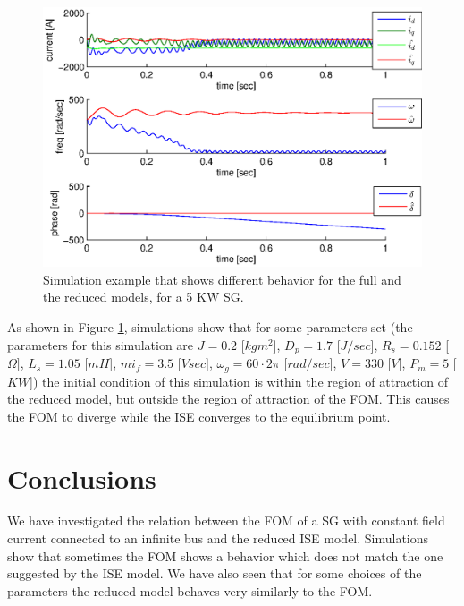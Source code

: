 \documentclass[conference]{IEEEtran}
\begin{document}
\begin{figure}[ht]
\includegraphics[scale=0.6]{simDiffRegionOFAttraction}
\caption{Simulation example that shows different behavior for the 
full and the reduced models, for a 5 KW SG.}
\label{fig:InfBusOne1DiffRegionOfAttraction}
\end{figure}

As shown in Figure \ref{fig:InfBusOne1DiffRegionOfAttraction},
simulations show that for some parameters set (the parameters for this
simulation are $J=0.2$ {[}$kgm^{2}${]}, $D_{p}=1.7$ {[}$J/sec${]},
$R_{s}=0.152$ {[}$\Omega]$, $L_{s}=1.05$ {[}$mH${]}, $mi_{f}=3.5$
{[}$Vsec]$, $\omega_{g}=60\cdotp2\pi$ {[}$rad/sec${]}, $V=330$
{[}$V]$, $P_m=5$ {[}$KW${]}) the initial condition of this simulation
is within the region of attraction of the reduced model, but outside
the region of attraction of the FOM. This causes the FOM to diverge
while the ISE converges to the equilibrium point.

\section{Conclusions}

We have investigated the relation between the FOM of a SG with constant
field current connected to an infinite bus and the reduced ISE model. 
Simulations show that sometimes the FOM shows a behavior which does
not match the one suggested by the ISE model. We have also seen that for some choices of the parameters the reduced model behaves very similarly to the FOM.
\end{document}
